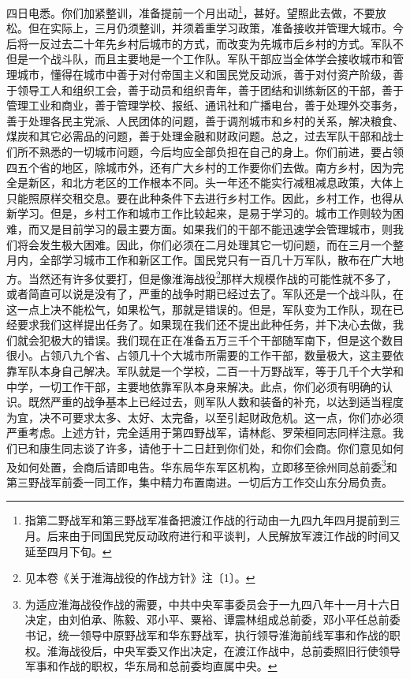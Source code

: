 \documentclass[cn,11pt,chinese]{elegantbook}
\begin{document}
四日电悉。你们加紧整训，准备提前一个月出动\footnote[1]{ 指第二野战军和第三野战军准备把渡江作战的行动由一九四九年四月提前到三月。后来由于同国民党反动政府进行和平谈判，人民解放军渡江作战的时间又延至四月下旬。}，甚好。望照此去做，不要放松。但在实际上，三月仍须整训，并须着重学习政策，准备接收并管理大城市。今后将一反过去二十年先乡村后城市的方式，而改变为先城市后乡村的方式。军队不但是一个战斗队，而且主要地是一个工作队。军队干部应当全体学会接收城市和管理城市，懂得在城市中善于对付帝国主义和国民党反动派，善于对付资产阶级，善于领导工人和组织工会，善于动员和组织青年，善于团结和训练新区的干部，善于管理工业和商业，善于管理学校、报纸、通讯社和广播电台，善于处理外交事务，善于处理各民主党派、人民团体的问题，善于调剂城市和乡村的关系，解决粮食、煤炭和其它必需品的问题，善于处理金融和财政问题。总之，过去军队干部和战士们所不熟悉的一切城市问题，今后均应全部负担在自己的身上。你们前进，要占领四五个省的地区，除城市外，还有广大乡村的工作要你们去做。南方乡村，因为完全是新区，和北方老区的工作根本不同。头一年还不能实行减租减息政策，大体上只能照原样交租交息。要在此种条件下去进行乡村工作。因此，乡村工作，也得从新学习。但是，乡村工作和城市工作比较起来，是易于学习的。城市工作则较为困难，而又是目前学习的最主要方面。如果我们的干部不能迅速学会管理城市，则我们将会发生极大困难。因此，你们必须在二月处理其它一切问题，而在三月一个整月内，全部学习城市工作和新区工作。国民党只有一百几十万军队，散布在广大地方。当然还有许多仗要打，但是像淮海战役\footnote[2]{ 见本卷《关于淮海战役的作战方针》注〔1〕。}那样大规模作战的可能性就不多了，或者简直可以说是没有了，严重的战争时期已经过去了。军队还是一个战斗队，在这一点上决不能松气，如果松气，那就是错误的。但是，军队变为工作队，现在已经要求我们这样提出任务了。如果现在我们还不提出此种任务，并下决心去做，我们就会犯极大的错误。我们现在正在准备五万三千个干部随军南下，但是这个数目很小。占领八九个省、占领几十个大城市所需要的工作干部，数量极大，这主要依靠军队本身自己解决。军队就是一个学校，二百一十万野战军，等于几千个大学和中学，一切工作干部，主要地依靠军队本身来解决。此点，你们必须有明确的认识。既然严重的战争基本上已经过去，则军队人数和装备的补充，以达到适当程度为宜，决不可要求太多、太好、太完备，以至引起财政危机。这一点，你们亦必须严重考虑。上述方针，完全适用于第四野战军，请林彪、罗荣桓同志同样注意。我们已和康生同志谈了许多，请他于十二日赶到你们处，和你们会商。你们意见如何及如何处置，会商后请即电告。华东局华东军区机构，立即移至徐州同总前委\footnote[3]{ 为适应淮海战役作战的需要，中共中央军事委员会于一九四八年十一月十六日决定，由刘伯承、陈毅、邓小平、粟裕、谭震林组成总前委，邓小平任总前委书记，统一领导中原野战军和华东野战军，执行领导淮海前线军事和作战的职权。淮海战役后，中央军委又作出决定，在渡江作战中，总前委照旧行使领导军事和作战的职权，华东局和总前委均直属中央。}和第三野战军前委一同工作，集中精力布置南进。一切后方工作交山东分局负责。\\
\end{document}
